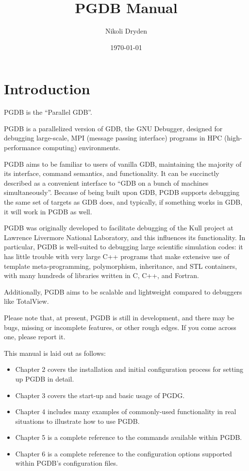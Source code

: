 \documentclass{refart}
\title{PGDB Manual}
\author{Nikoli Dryden}
\date{\today}
\begin{document}
\maketitle

\newpage

\setcounter{page}{1}
\tableofcontents

\newpage

\setcounter{page}{1}

\section{Introduction}

PGDB is the ``Parallel GDB''.

PGDB is a parallelized version of GDB, the GNU Debugger, designed for debugging large-scale, MPI (message passing interface) programs in HPC (high-performance computing) environments.

PGDB aims to be familiar to users of vanilla GDB, maintaining the majority of its interface, command semantics, and functionality. It can be succinctly described as a convenient interface to ``GDB on a bunch of machines simultaneously''. Because of being built upon GDB, PGDB supports debugging the same set of targets as GDB does, and typically, if something works in GDB, it will work in PGDB as well.

PGDB was originally developed to facilitate debugging of the Kull project at Lawrence Livermore National Laboratory, and this influences its functionality. In particular, PGDB is well-suited to debugging large scientific simulation codes: it has little trouble with very large C++ programs that make extensive use of template meta-programming, polymorphism, inheritance, and STL containers, with many hundreds of libraries written in C, C++, and Fortran.

Additionally, PGDB aims to be scalable and lightweight compared to debuggers like TotalView.

Please note that, at present, PGDB is still in development, and there may be bugs, missing or incomplete features, or other rough edges. If you come across one, please report it.

This manual is laid out as follows:

\begin{itemize}
\item Chapter 2 covers the installation and initial configuration process for setting up PGDB in detail.
\item Chapter 3 covers the start-up and basic usage of PGDG.
\item Chapter 4 includes many examples of commonly-used functionality in real situations to illustrate how to use PGDB.
\item Chapter 5 is a complete reference to the commands available within PGDB.
\item Chapter 6 is a complete reference to the configuration options supported within PGDB's configuration files.
\end{itemize}
\end{document}
